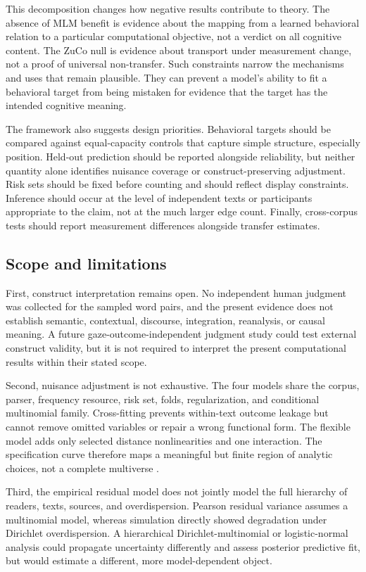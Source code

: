 \documentclass[11pt]{article}
\begin{document}
This decomposition changes how negative results contribute to theory. The absence of MLM benefit is evidence about the mapping from a learned behavioral relation to a particular computational objective, not a verdict on all cognitive content. The ZuCo null is evidence about transport under measurement change, not a proof of universal non-transfer. Such constraints narrow the mechanisms and uses that remain plausible. They can prevent a model's ability to fit a behavioral target from being mistaken for evidence that the target has the intended cognitive meaning.

The framework also suggests design priorities. Behavioral targets should be compared against equal-capacity controls that capture simple structure, especially position. Held-out prediction should be reported alongside reliability, but neither quantity alone identifies nuisance coverage or construct-preserving adjustment. Risk sets should be fixed before counting and should reflect display constraints. Inference should occur at the level of independent texts or participants appropriate to the claim, not at the much larger edge count. Finally, cross-corpus tests should report measurement differences alongside transfer estimates.

\subsection{Scope and limitations}

First, construct interpretation remains open. No independent human judgment was collected for the sampled word pairs, and the present evidence does not establish semantic, contextual, discourse, integration, reanalysis, or causal meaning. A future gaze-outcome-independent judgment study could test external construct validity, but it is not required to interpret the present computational results within their stated scope.

Second, nuisance adjustment is not exhaustive. The four models share the corpus, parser, frequency resource, risk set, folds, regularization, and conditional multinomial family. Cross-fitting prevents within-text outcome leakage but cannot remove omitted variables or repair a wrong functional form. The flexible model adds only selected distance nonlinearities and one interaction. The specification curve therefore maps a meaningful but finite region of analytic choices, not a complete multiverse \citep{steegen2016,simonsohn2020}.

Third, the empirical residual model does not jointly model the full hierarchy of readers, texts, sources, and overdispersion. Pearson residual variance assumes a multinomial model, whereas simulation directly showed degradation under Dirichlet overdispersion. A hierarchical Dirichlet-multinomial or logistic-normal analysis could propagate uncertainty differently and assess posterior predictive fit, but would estimate a different, more model-dependent object.
\end{document}
